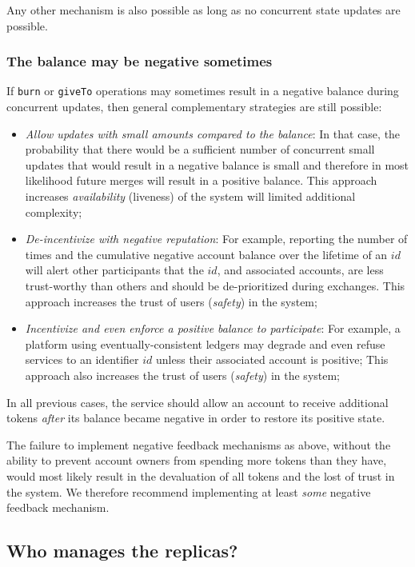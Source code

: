 \documentclass[9pt, oneside]{article}   	%
\begin{document}
Any other mechanism is also possible as long as no concurrent state updates are possible.

\subsubsection{The balance may be negative sometimes}

If \texttt{burn} or \texttt{giveTo} operations may sometimes result in a negative balance during concurrent updates, then general complementary strategies are still possible:
\begin{itemize}
	\item \textit{Allow updates with small amounts compared to the balance}: In that case, the probability that there would be a sufficient number of concurrent small updates that would result in a negative balance is small and therefore in most likelihood future merges will result in a positive balance. This approach increases \textit{availability} (liveness) of the system will limited additional complexity;
	\item \textit{De-incentivize with negative reputation}: For example, reporting the number of times and the cumulative negative account balance over the lifetime of an $id$ will alert other participants that the $id$, and associated accounts, are less trust-worthy than others and should be de-prioritized during exchanges. This approach increases the trust of users (\textit{safety}) in the system;
	\item \textit{Incentivize and even enforce a positive balance to participate}: For example, a platform using eventually-consistent ledgers may degrade and even refuse services to an identifier $id$ unless their associated account is positive;  This approach also increases the trust of users (\textit{safety}) in the system;
\end{itemize}

In all previous cases, the service should allow an account to receive additional tokens \textit{after} its balance became negative in order to restore its positive state. 

The failure to implement negative feedback mechanisms as above, without the ability to prevent account owners from spending more tokens than they have, would most likely result in the devaluation of all tokens and the lost of trust in the system. We therefore recommend implementing at least \textit{some} negative feedback mechanism.

\subsection{Who manages the replicas?}
\end{document}

